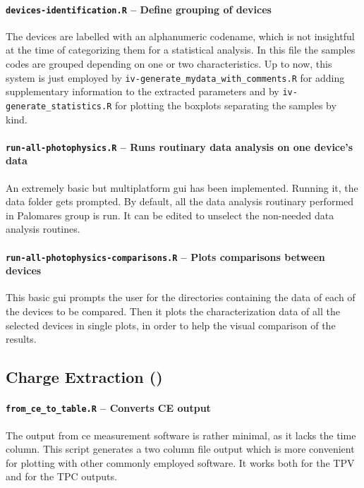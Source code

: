 		\paragraph{\texttt{devices-identification.R} -- Define grouping of devices}
		The devices are labelled with an alphanumeric codename, which is not insightful at the time of categorizing them for a statistical analysis.
		In this file the samples codes are grouped depending on one or two characteristics.
		Up to now, this system is just employed by \texttt{iv-generate_mydata_with_comments.R} for adding supplementary information to the extracted parameters and by \texttt{iv-generate_statistics.R} for plotting the boxplots separating the samples by kind.

		\paragraph{\texttt{run-all-photophysics.R} -- Runs routinary data analysis on one device's data}
		An extremely basic but multiplatform \gls{gui} has been implemented.
		Running it, the data folder gets prompted.
		By default, all the data analysis routinary performed in Palomares group is run.
		It can be edited to unselect the non-needed data analysis routines.
		
		\paragraph{\texttt{run-all-photophysics-comparisons.R} -- Plots comparisons between devices}
		This basic \gls{gui} prompts the user for the directories containing the data of each of the devices to be compared.
		Then it plots the characterization data of all the selected devices in single plots, in order to help the visual comparison of the results.
		


	\subsection{Charge Extraction ()}\label{r_ce}

		\paragraph{\texttt{from_ce_to_table.R} -- Converts CE output}
		The output from \gls{ce} measurement software is rather minimal, as it lacks the time column.
		This script generates a two column file output which is more convenient for plotting with other commonly employed software.
		It works both for the TPV and for the TPC outputs.
		
